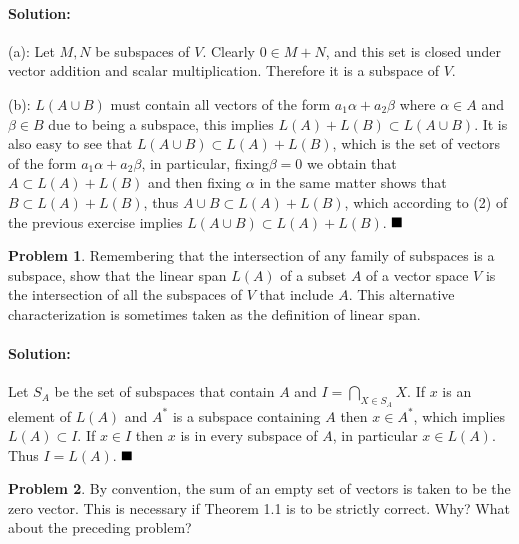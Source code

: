 \documentclass[]{article}
\theoremstyle{definition}
\newtheorem{problem}{Problem}
\newenvironment{solution}{\paragraph{Solution:}}{\hfill$\blacksquare \\$}
\begin{document}
\begin{solution}
	(a): Let $M, N$ be subspaces of $V$. Clearly $0 \in M + N$, and this set is closed under vector addition and scalar multiplication. Therefore it is a subspace of $V$.
	\par
	(b): $L(A \cup B)$ must contain all vectors of the form $a_1\alpha + a_2\beta$ where $\alpha \in A$ and $\beta \in B$ due to being a subspace, this implies $L(A) + L(B) \subset L(A \cup B)$. It is also easy to see that $L(A \cup B) \subset L(A) + L(B)$, which is the set of vectors of the form $a_1 \alpha + a_2 \beta$, in particular, fixing$\beta = 0$ we obtain that $A \subset L(A) + L(B)$ and then fixing $\alpha$ in the same matter shows that $B \subset L(A) + L(B)$, thus $A \cup B \subset L(A) + L(B)$, which according to (2) of the previous exercise implies $L(A \cup B) \subset L(A) + L(B)$.
\end{solution}
\begin{problem}
	Remembering that the intersection of any family of subspaces is a subspace, show that the linear span $L(A)$ of a subset $A$ of a vector space $V$ is the intersection of all the subspaces of $V$ that include $A$. This alternative characterization is sometimes taken as the definition of linear span.
\end{problem}
\begin{solution}
	Let $S_A$ be the set of subspaces that contain $A$ and $I = \bigcap_{X \in S_A} X$.
	If $x$ is an element of $L(A)$ and $A^*$ is a subspace containing $A$ then $x \in A^*$, which implies $L(A) \subset I$. If $x \in I$ then $x$ is in every subspace of $A$, in particular $x \in L(A)$. Thus $I = L(A)$.
\end{solution}
\begin{problem}
By convention, the sum of an empty set of vectors is taken to be the zero vector. This is necessary if Theorem 1.1 is to be strictly correct. Why? What about the preceding problem?	
\end{problem}
\end{document}
